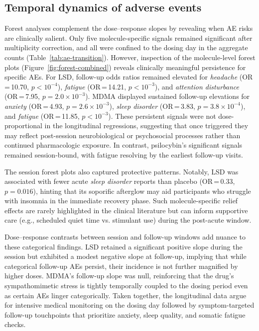 \subsection{Temporal dynamics of adverse events}

Forest analyses complement the dose--response slopes by revealing when AE risks are clinically salient.
Only five molecule-specific signals remained significant after multiplicity correction, and all were confined to the dosing day in the aggregate counts (Table~\ref{tab:ae-transition}).
However, inspection of the molecule-level forest plots (Figure~\ref{fig:forest-combined}) reveals clinically meaningful persistence for specific AEs.
For LSD, follow-up odds ratios remained elevated for \textit{headache} (OR\,=\,10.70, $p<10^{-4}$), \textit{fatigue} (OR\,=\,14.21, $p<10^{-3}$), and \textit{attention disturbance} (OR\,=\,7.95, $p=2.0\times10^{-3}$).
MDMA displayed sustained follow-up elevations for \textit{anxiety} (OR\,=\,4.93, $p=2.6\times10^{-3}$), \textit{sleep disorder} (OR\,=\,3.83, $p=3.8\times10^{-4}$), and \textit{fatigue} (OR\,=\,11.85, $p<10^{-3}$).
These persistent signals were not dose-proportional in the longitudinal regressions, suggesting that once triggered they may reflect post-session neurobiological or psychosocial processes rather than continued pharmacologic exposure.
In contrast, psilocybin’s significant signals remained session-bound, with fatigue resolving by the earliest follow-up visits.

The session forest plots also captured protective patterns.
Notably, LSD was associated with fewer acute \textit{sleep disorder} reports than placebo (OR\,=\,0.33, $p=0.016$), hinting that its soporific afterglow may aid participants who struggle with insomnia in the immediate recovery phase.
Such molecule-specific relief effects are rarely highlighted in the clinical literature but can inform supportive care (e.g., scheduled quiet time vs. stimulant use) during the post-acute window.

Dose--response contrasts between session and follow-up windows add nuance to these categorical findings.
LSD retained a significant positive slope during the session but exhibited a modest negative slope at follow-up, implying that while categorical follow-up AEs persist, their incidence is not further magnified by higher doses.
MDMA’s follow-up slope was null, reinforcing that the drug’s sympathomimetic stress is tightly temporally coupled to the dosing period even as certain AEs linger categorically.
Taken together, the longitudinal data argue for intensive medical monitoring on the dosing day followed by symptom-targeted follow-up touchpoints that prioritize anxiety, sleep quality, and somatic fatigue checks.

